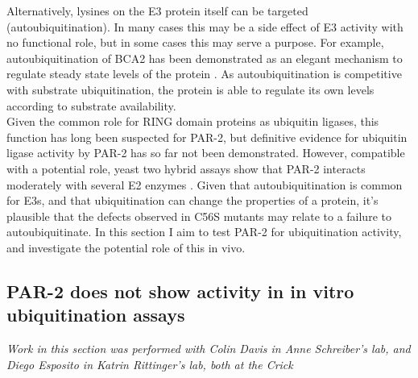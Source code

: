 \documentclass[12pt]{"report"}
\begin{document}
Alternatively, lysines on the E3 protein itself can be targeted (autoubiquitination). In many cases this may be a side effect of E3 activity with no functional role, but in some cases this may serve a purpose. For example, autoubiquitination of BCA2 has been demonstrated as an elegant mechanism to regulate steady state levels of the protein \citep{Amemiya2008}. As autoubiquitination is competitive with substrate ubiquitination, the protein is able to regulate its own levels according to substrate availability.\\

Given the common role for RING domain proteins as ubiquitin ligases, this function has long been suspected for PAR-2, but definitive evidence for ubiquitin ligase activity by PAR-2 has so far not been demonstrated. However, compatible with a potential role, yeast two hybrid assays show that PAR-2 interacts moderately with several E2 enzymes \citep{Gudgen2004}. Given that autoubiquitination is common for E3s, and that ubiquitination can change the properties of a protein, it's plausible that the defects observed in C56S mutants may relate to a failure to autoubiquitinate. In this section I aim to test PAR-2 for ubiquitination activity, and investigate the potential role of this in vivo.\\

\subsection{PAR-2 does not show activity in in vitro ubiquitination assays}

\textit{Work in this section was performed with Colin Davis in Anne Schreiber's lab, and Diego Esposito in Katrin Rittinger's lab, both at the Crick}\\
\end{document}
